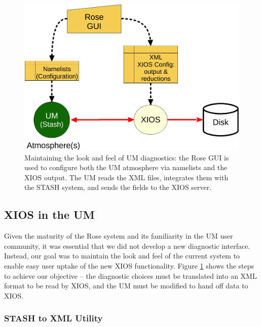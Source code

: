 \documentclass[twocolumn, 12pt]{paper}
\begin{document}
\begin{figure}[H]
	\centerline{
	\includegraphics[scale=0.5]{figures/xios_config.pdf}
	}
	\caption{Maintaining the look and feel of UM diagnostics: the Rose GUI is used to configure both the UM atmosphere via namelists and the XIOS output. The UM reads the XML files, integrates them with the STASH system, and sends the fields to the XIOS server.}
	\label{fig-xconfig}
\end{figure}





\subsection{XIOS in the UM}

Given the maturity of the Rose system and its familiarity in the UM user community, it was essential that we did not develop a new diagnostic interface.
Instead, our goal was to maintain the look and feel of the current system to enable easy user uptake of the new XIOS functionality.
Figure \ref{fig-xconfig} shows the steps to achieve our objective -- the diagnostic choices must be translated into an XML format to be read by XIOS, and the UM must be modified to hand off data to XIOS.

\subsubsection{STASH to XML Utility}
\label{stash2xml}
\end{document}
